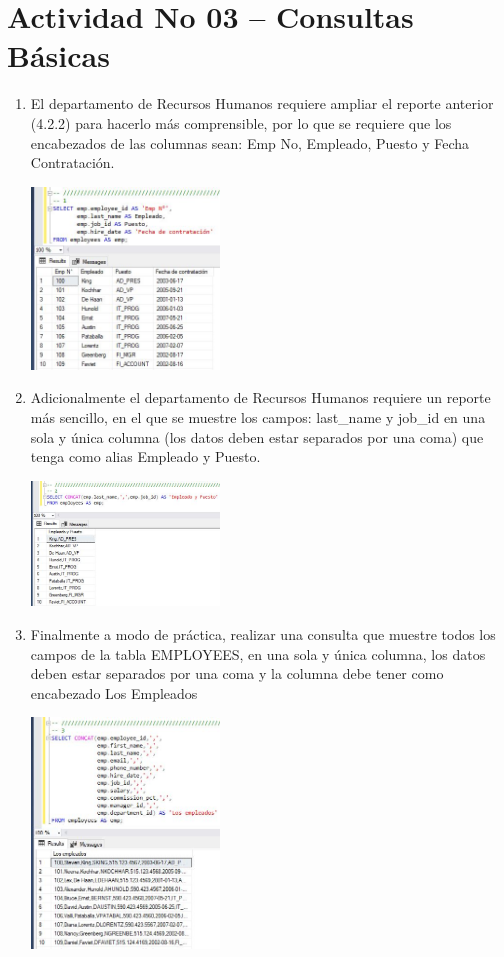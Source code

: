 \section{Actividad No 03 – Consultas B\'asicas} 
		
\begin{enumerate}[1.]
	\item El departamento de Recursos Humanos requiere ampliar el reporte anterior (4.2.2) para hacerlo m\'as comprensible, por lo que se requiere que los encabezados de las columnas sean: Emp No, Empleado, Puesto y Fecha Contrataci\'on.

	\begin{center}
	\includegraphics[width=5cm]{./Imagenes/actividad0301} 
	\end{center}

	\item Adicionalmente el departamento de Recursos Humanos requiere un reporte más sencillo, en el que se muestre los campos: last\_name y job\_id en una sola y \'unica columna (los datos deben estar separados por una coma) que tenga como alias Empleado y Puesto.

	\begin{center}
	\includegraphics[width=5cm]{./Imagenes/actividad0302} 
	\end{center}

	\item Finalmente a modo de práctica, realizar una consulta que muestre todos los campos de la tabla EMPLOYEES, en una sola y única columna, los datos deben estar separados por una coma y la columna debe tener como encabezado Los Empleados

	\begin{center}
	\includegraphics[width=5cm]{./Imagenes/actividad0303} 
	\end{center}

\end{enumerate}



